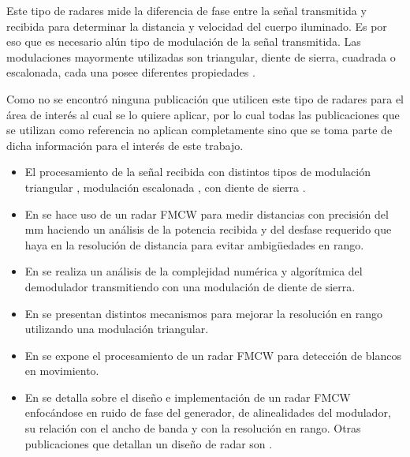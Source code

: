 Este tipo de radares mide la diferencia de fase entre la señal transmitida y recibida para determinar la distancia y velocidad del cuerpo iluminado. Es por eso que es necesario alún tipo de modulación de la señal transmitida. Las modulaciones mayormente utilizadas son triangular, diente de sierra, cuadrada o escalonada, cada una posee diferentes propiedades \cite{Basics2015}.

Como no se encontró ninguna publicación que utilicen este tipo de radares para el área de interés al cual se lo quiere aplicar, por lo cual todas las publicaciones que se utilizan como referencia no aplican completamente sino que se toma parte de dicha información para el interés de este trabajo. 

\begin{itemize}

    \item El procesamiento de la señal recibida con distintos tipos de modulación triangular \cite{Chang2006}, modulación escalonada \cite{steppedFreq}, con diente de sierra \cite{Shen, Varavin2007a}. 

    \item En \cite{Brennan2014a} se hace uso de un radar FMCW para medir distancias con precisión del $\si{\milli\meter}$ haciendo un análisis de la potencia recibida y del desfase requerido que haya en la resolución de distancia para evitar ambigüedades en rango.

    \item En \cite{Shen} se realiza un análisis de la complejidad numérica y algorítmica del demodulador transmitiendo con una modulación de diente de sierra.

    \item En \cite{Kurt2007} se presentan distintos mecanismos para mejorar la resolución en rango utilizando una modulación triangular. 

    \item En \cite{Lipa1990} se expone el procesamiento de un radar FMCW para detección de blancos en movimiento.

    \item En \cite{Brooker2005} se detalla sobre el diseño e implementación de un radar FMCW enfocándose en ruido de fase del generador, de alinealidades del modulador, su relación con el ancho de banda y con la resolución en rango. Otras publicaciones que detallan un diseño de radar son \cite{Chan2009, Wavemaker2015}. 

\end{itemize}

